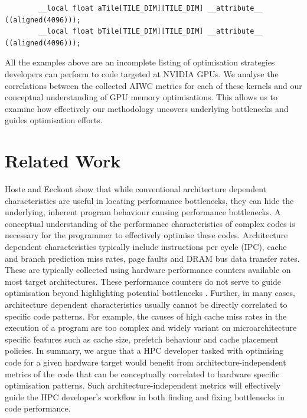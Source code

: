 \documentclass[review=false, sigchi]{acmart}
\begin{document}
	\begin{lstlisting}
		__local float aTile[TILE_DIM][TILE_DIM] __attribute__ ((aligned(4096)));
		__local float bTile[TILE_DIM][TILE_DIM] __attribute__ ((aligned(4096)));
	\end{lstlisting}
	
	All the examples above are an incomplete listing of optimisation strategies developers can perform to code targeted at NVIDIA GPUs. We analyse the correlations between the collected AIWC metrics for each of these kernels and our conceptual understanding of GPU memory optimisations. This allows us to examine how effectively our methodology uncovers underlying bottlenecks and guides optimisation efforts.
	
	\flushbottom
	\section{Related Work} \label{related work}
	
	Hoste and Eeckout \cite{hoste2007microarchitecture} show that while conventional architecture dependent characteristics are useful in locating performance bottlenecks, they can hide the underlying, inherent program behaviour causing performance bottlenecks. A conceptual understanding of the performance characteristics of complex codes is necessary for the programmer to effectively optimise these codes. Architecture dependent characteristics typically include instructions per cycle (IPC), cache and branch prediction miss rates, page faults and DRAM bus data transfer rates. These are typically collected using hardware performance counters available on most target architectures. These performance counters do not serve to guide optimisation beyond highlighting potential bottlenecks \cite{hoste2007microarchitecture, ganesan2008performance}. Further, in many cases, architecture dependent characteristics usually cannot be directly correlated to specific code patterns. For example, the causes of high cache miss rates in the execution of a program are too complex and widely variant on microarchitecture specific features such as cache size, prefetch behaviour and cache placement policies. In summary, we argue that a HPC developer tasked with optimising code for a given hardware target would benefit from architecture-independent metrics of the code that can be conceptually correlated to hardware specific optimisation patterns. Such architecture-independent metrics will effectively guide the HPC developer's workflow in both finding and fixing bottlenecks in code performance.
	
\end{document}
